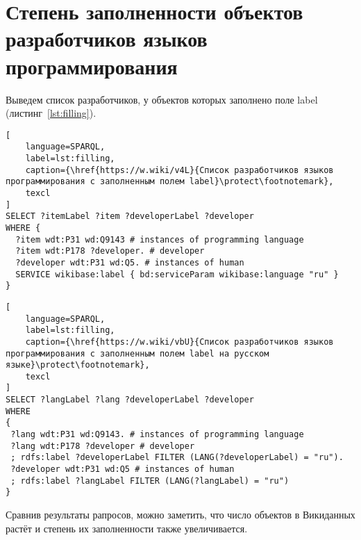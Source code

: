 \newpage
\section{Степень заполненности объектов разработчиков языков программирования}
Выведем список разработчиков, у объектов которых заполнено поле label (листинг~\ref{lst:filling}).

\begin{lstlisting}[
	language=SPARQL,
	label=lst:filling,
	caption={\href{https://w.wiki/v4L}{Список разработчиков языков программирования с заполненным полем label}\protect\footnotemark},
	texcl
]
SELECT ?itemLabel ?item ?developerLabel ?developer
WHERE {
  ?item wdt:P31 wd:Q9143 # instances of programming language
  ?item wdt:P178 ?developer. # developer 
  ?developer wdt:P31 wd:Q5. # instances of human
  SERVICE wikibase:label { bd:serviceParam wikibase:language "ru" }
}
\end{lstlisting}

\begin{lstlisting}[
	language=SPARQL,
	label=lst:filling,
	caption={\href{https://w.wiki/vbU}{Список разработчиков языков программирования с заполненным полем label на русском языке}\protect\footnotemark},
	texcl
]
SELECT ?langLabel ?lang ?developerLabel ?developer
WHERE
{
 ?lang wdt:P31 wd:Q9143. # instances of programming language
 ?lang wdt:P178 ?developer # developer 
 ; rdfs:label ?developerLabel FILTER (LANG(?developerLabel) = "ru").
 ?developer wdt:P31 wd:Q5 # instances of human
 ; rdfs:label ?langLabel FILTER (LANG(?langLabel) = "ru")
}
\end{lstlisting}

Сравнив результаты рапросов, можно заметить, что число объектов в Викиданных растёт и степень их заполненности также увеличивается.

